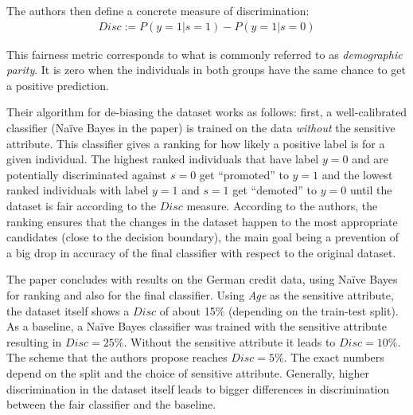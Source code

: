 The authors then define a concrete measure of discrimination:
\begin{align}
  \label{eq:disc}
  Disc := P(y=1|s =1) - P(y=1|s = 0)
\end{align}

This fairness metric corresponds to what is commonly referred to as \emph{demographic parity}.
It is zero when the individuals in both groups have the same chance to get a positive prediction.

Their algorithm for de-biasing the dataset works as follows:
first, a well-calibrated classifier (Na\"ive Bayes in the paper) is trained on the data
\emph{without} the sensitive attribute.
This classifier gives a ranking for how likely a positive label is for a given individual.
The highest ranked individuals that have label \(y=0\)
and are potentially discriminated against \(s=0\) get ``promoted'' to \(y=1\)
and the lowest ranked individuals with label \(y=1\) and \(s=1\) get ``demoted'' to \(y=0\)
until the dataset is fair according to the \(Disc\) measure.
According to the authors, the ranking ensures that the changes in the dataset
happen to the most appropriate candidates (close to the decision boundary),
the main goal being a prevention of a big drop in accuracy of the final classifier
with respect to the original dataset.

The paper concludes with results on the German credit data,
using Na\"ive Bayes for ranking and also for the final classifier.
Using \emph{Age} as the sensitive attribute,
the dataset itself shows a \(Disc\) of about 15\% (depending on the train-test split).
As a baseline, a Na\"ive Bayes classifier was trained with the sensitive attribute
resulting in \(Disc = 25\%\).
Without the sensitive attribute it leads to \(Disc = 10\%\).
The scheme that the authors propose reaches \(Disc = 5\%\).
The exact numbers depend on the split and the choice of sensitive attribute.
Generally, higher discrimination in the dataset itself
leads to bigger differences in discrimination between the fair classifier and the baseline.

